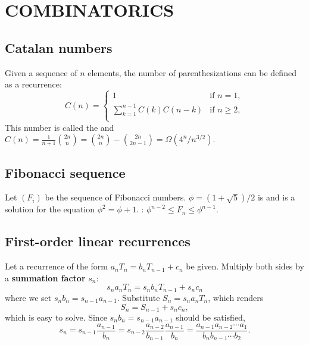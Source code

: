 \section{COMBINATORICS}
\subsection{Catalan numbers}
\bit
\w Given a sequence of $n$ elements, the number of parenthesizations 
   can be defined as a recurrence:
\[ C(n) = \left\{\begin{array}{ll}
   1 & \mbox{if\ } n = 1,\\
   \sum_{k=1}^{n-1}C(k)C(n-k) & \mbox{if\ } n \ge 2,\\
	    \end{array}\right.\]
   This number is called the  and
  $C(n) = \frac{1}{n+1}{2n \choose n} = {2n \choose n} - {2n \choose 2n-1}
   = \Omega\left(4^n/n^{3/2}\right)$.
\eit

\subsection{Fibonacci sequence}
\bit
\w Let $(F_i)$ be the sequence of Fibonacci numbers.
\w $\phi = (1 + \sqrt{5})/2$ is  and is a solution for 
   the equation $\phi^2 = \phi + 1$.
\w {}: $\phi^{n-2} \le F_n \le \phi^{n-1}$.
\eit

	

\subsection{First-order linear recurrences}
\bit
\w Let a recurrence of the form
	$a_nT_n = b_nT_{n-1} + c_n$ be given.
\ben
\w Multiply both sides by a {\bf{}summation factor} $s_n$:
	\[ s_na_nT_n = s_nb_nT_{n-1} + s_nc_n\]
	where we set {$s_nb_n = s_{n-1}a_{n-1}$}.
\w Substitute $S_n = s_na_nT_n$, which renders
	\[ S_n = S_{n-1} + s_nc_n, \]
	which is easy to solve.
	Since $s_nb_n = s_{n-1}a_{n-1}$ should
	be satisfied,
	\[s_n  =  s_{n-1}\frac{a_{n-1}}{b_n} =
	s_{n-2}\frac{a_{n-2}}{b_{n-1}}\frac{a_{n-1}}{b_n} = \frac{a_{n-1}a_{n-2}\cdots{a_1}}{b_nb_{n-1}\cdots{b_2}}.\]

\een
\eit

